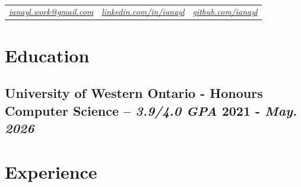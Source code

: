 \documentclass[9pt]{article}
\author{Ian Li}
\makeatletter
\renewcommand{\maketitle}{
		\vspace{-8.5em}
    \begin{center}
		{\huge\bfseries
		\theauthor}
    \\
      \vspace{0.25em}
\begin{tabular}{ c | c | c }
  \href{mailto:ianayl.work@gmail.com}{\textit{ianayl.work@gmail.com}} & \href{https://www.linkedin.com/in/ianayl}{\textit{linkedin.com/in/ianayl}} & \href{https://www.github.com/ianayl}{\textit{github.com/ianayl}}
\end{tabular}
    \end{center}
    \vspace{-2.5em}
}
\makeatother
\begin{document}
\maketitle

\section{Education}
\subsection{\textnormal{University of Western Ontario - \normalsize Honours Computer Science -- \textit{3.9/4.0 GPA}} \hfill \normalsize\textnormal{2021 - \textit{May. 2026}}}
\vspace{0.5em}

\section{Experience}
\end{document}
